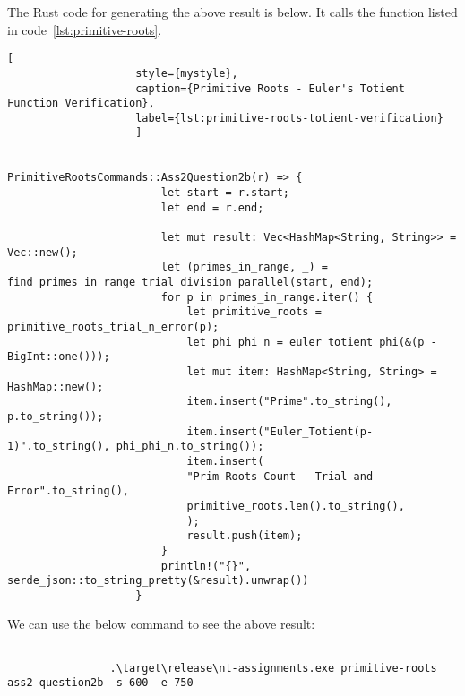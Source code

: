 \documentclass[11pt,a4paper]{article}
\begin{document}
\begin{enumerate}[1.]
\begin{enumerate}[a.]
\begin{flushleft}
				The Rust code for generating the above result is below. It calls the function listed in code~\ref{lst:primitive-roots}.
				\begin{lstlisting}[
					style={mystyle},
					caption={Primitive Roots - Euler's Totient Function Verification},
					label={lst:primitive-roots-totient-verification}
					]
					
					            PrimitiveRootsCommands::Ass2Question2b(r) => {
						let start = r.start;
						let end = r.end;
						
						let mut result: Vec<HashMap<String, String>> = Vec::new();
						let (primes_in_range, _) = find_primes_in_range_trial_division_parallel(start, end);
						for p in primes_in_range.iter() {
							let primitive_roots = primitive_roots_trial_n_error(p);
							let phi_phi_n = euler_totient_phi(&(p - BigInt::one()));
							let mut item: HashMap<String, String> = HashMap::new();
							item.insert("Prime".to_string(), p.to_string());
							item.insert("Euler_Totient(p-1)".to_string(), phi_phi_n.to_string());
							item.insert(
							"Prim Roots Count - Trial and Error".to_string(),
							primitive_roots.len().to_string(),
							);
							result.push(item);
						}
						println!("{}", serde_json::to_string_pretty(&result).unwrap())
					}
				\end{lstlisting}
				
				\bigbreak
				We can use the below command to see the above result:
				\begin{lstlisting}[style=DOS, caption=Verify Primitive Roots Counting using Totient Function]
					
				.\target\release\nt-assignments.exe primitive-roots ass2-question2b -s 600 -e 750
				\end{lstlisting}
			\end{flushleft}
			

\end{enumerate}
\end{enumerate}
\end{document}

